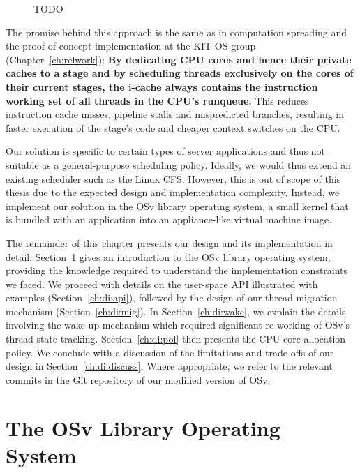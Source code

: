 \documentclass[12pt,a4paper]{book}
\begin{document}
\begin{figure}[h]
    \caption{TODO}
\end{figure}

The promise behind this approach is the same as in computation spreading and the proof-of-concept implementation at the KIT OS group (Chapter~\ref{ch:relwork}):
\textbf{By dedicating CPU cores and hence their private caches to a stage and by scheduling threads exclusively on the cores of their current stages, the i-cache always contains the instruction working set of all threads in the CPU's runqueue.}
This reduces instruction cache misses, pipeline stalls and mispredicted branches, resulting in faster execution of the stage's code and cheaper context switches on the CPU. 

Our solution is specific to certain types of server applications and thus not suitable as a general-purpose scheduling policy.
Ideally, we would thus extend an existing scheduler such as the Linux CFS.
However, this is out of scope of this thesis due to the expected design and implementation complexity.
Instead, we implement our solution in the OSv library operating system, a small kernel that is bundled with an application into an appliance-like virtual machine image.

The remainder of this chapter presents our design and its implementation in detail:
Section~\ref{ch:di:osv} gives an introduction to the OSv library operating system, providing the knowledge required to understand the implementation constraints we faced.
We proceed with details on the user-space API illustrated with examples (Section~\ref{ch:di:api}), followed by the design of our thread migration mechanism (Section~\ref{ch:di:mig}).
In Section~\ref{ch:di:wake}, we explain the details involving the wake-up mechanism which required significant re-working of OSv's thread state tracking.
Section~\ref{ch:di:pol} then presents the CPU core allocation policy.
We conclude with a discussion of the limitations and trade-offs of our design in Section~\ref{ch:di:discuss}.
Where appropriate, we refer to the relevant commits in the Git repository of our modified version of OSv.

\section{The OSv Library Operating System}\label{ch:di:osv}
%
\end{document}
